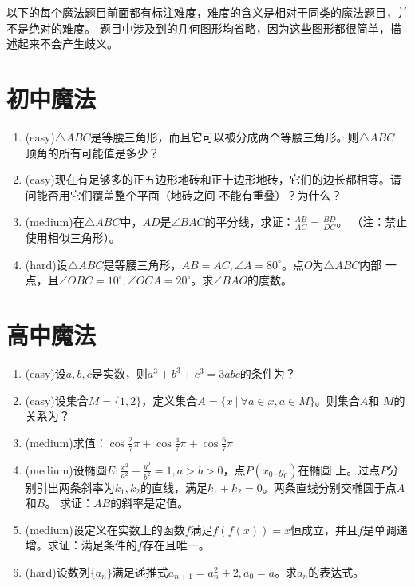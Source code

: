 \documentclass[a4paper]{article}
\begin{document}
以下的每个魔法题目前面都有标注难度，难度的含义是相对于同类的魔法题目，并不是绝对的难度。
题目中涉及到的几何图形均省略，因为这些图形都很简单，描述起来不会产生歧义。
\section{初中魔法}
\begin{enumerate}
\item (easy)$\triangle ABC$是等腰三角形，而且它可以被分成两个等腰三角形。则$\triangle ABC$
顶角的所有可能值是多少？
\item (easy)现在有足够多的正五边形地砖和正十边形地砖，它们的边长都相等。请问能否用它们覆盖整个平面（地砖之间
不能有重叠）？为什么？
\item (medium)在$\triangle ABC$中，$AD$是$\angle BAC$的平分线，求证：$\frac{AB}{AC}=\frac{BD}{DC}$。
（注：禁止使用相似三角形）。
\item (hard)设$\triangle ABC$是等腰三角形，$AB=AC,\angle A=80^\circ$。点$O$为$\triangle ABC$内部
一点，且$\angle OBC=10^\circ,\angle OCA=20^\circ$。求$\angle BAO$的度数。
\end{enumerate}
\section{高中魔法}
\begin{enumerate}
\item (easy)设$a,b,c$是实数，则$a^3+b^3+c^3=3abc$的条件为？
\item (easy)设集合$M=\{1,2\}$，定义集合$A=\{x~|~\forall a \in x, a \in M \}$。则集合$A$和
$M$的关系为？
\item (medium)求值：$\cos\frac{2}{7}\pi+\cos\frac{4}{7}\pi+\cos\frac{6}{7}\pi$
\item (medium)设椭圆$E:\frac{x^2}{a^2}+\frac{y^2}{b^2}=1,a>b>0$，点$P(x_0,y_0)$在椭圆
上。过点$P$分别引出两条斜率为$k_1,k_2$的直线，满足$k_1+k_2=0$。两条直线分别交椭圆于点$A$和$B$。
求证：$AB$的斜率是定值。
\item (medium)设定义在实数上的函数$f$满足$f(f(x))=x$恒成立，并且$f$是单调递增。求证：满足条件的$f$存在且唯一。
\item (hard)设数列$\{a_n\}$满足递推式$a_{n+1}=a_n^2+2,a_0=a$。求$a_n$的表达式。
\end{enumerate}
\end{document}
